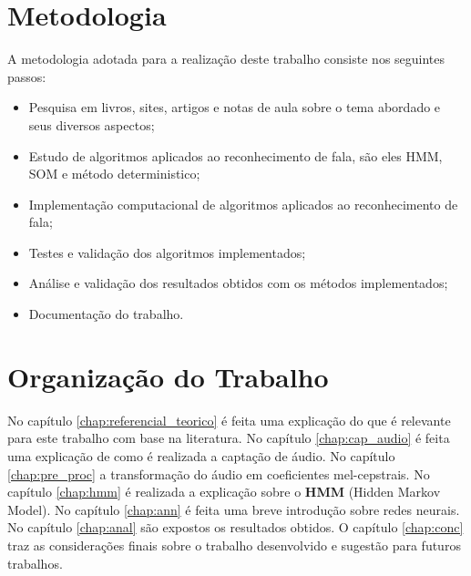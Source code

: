 \section{Metodologia}

\quad A metodologia adotada para a realização deste trabalho consiste nos seguintes passos:

\begin{itemize}
\item Pesquisa em livros, sites, artigos e notas de aula sobre o tema abordado e seus diversos aspectos;
\item Estudo de algoritmos aplicados ao reconhecimento de fala, são eles HMM, SOM e método deterministico;
\item Implementação computacional de algoritmos aplicados ao reconhecimento de fala;
\item Testes e validação dos algoritmos implementados;
\item Análise e validação dos resultados obtidos com os métodos implementados;
\item Documentação do trabalho. 

\end{itemize}

\section{Organização do Trabalho}
\quad No capítulo \ref{chap:referencial_teorico} é feita uma explicação do que é relevante para este trabalho com base na literatura. No capítulo \ref{chap:cap_audio}  é feita uma explicação de como é realizada a captação de áudio. No capítulo \ref{chap:pre_proc} a transformação do áudio em coeficientes mel-cepstrais. No capítulo \ref{chap:hmm} é realizada a explicação sobre o \textbf{HMM} (Hidden Markov Model). No capítulo \ref{chap:ann} é feita uma breve introdução sobre  redes neurais. No capítulo \ref{chap:anal} são expostos os resultados obtidos. O capítulo \ref{chap:conc} traz as considerações finais sobre o trabalho desenvolvido e sugestão para futuros trabalhos.

























